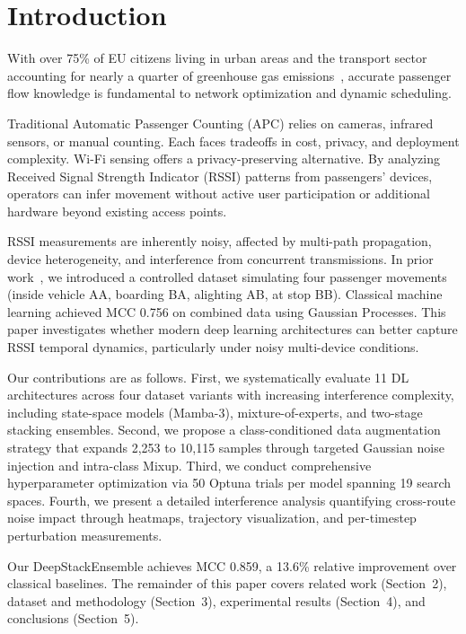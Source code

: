 \section{Introduction}

With over 75\% of EU citizens living in urban areas and the transport sector accounting for nearly a quarter of greenhouse gas emissions~\cite{eea2025transport}, accurate passenger flow knowledge is fundamental to network optimization and dynamic scheduling.

Traditional Automatic Passenger Counting (APC) relies on cameras, infrared sensors, or manual counting. Each faces tradeoffs in cost, privacy, and deployment complexity. Wi-Fi sensing offers a privacy-preserving alternative. By analyzing Received Signal Strength Indicator (RSSI) patterns from passengers' devices, operators can infer movement without active user participation or additional hardware beyond existing access points.

RSSI measurements are inherently noisy, affected by multi-path propagation, device heterogeneity, and interference from concurrent transmissions. In prior work~\cite{ribeiro2026eucnc}, we introduced a controlled dataset simulating four passenger movements (inside vehicle AA, boarding BA, alighting AB, at stop BB). Classical machine learning achieved MCC 0.756 on combined data using Gaussian Processes. This paper investigates whether modern deep learning architectures can better capture RSSI temporal dynamics, particularly under noisy multi-device conditions.

Our contributions are as follows. First, we systematically evaluate 11 DL architectures across four dataset variants with increasing interference complexity, including state-space models (Mamba-3), mixture-of-experts, and two-stage stacking ensembles. Second, we propose a class-conditioned data augmentation strategy that expands 2,253 to 10,115 samples through targeted Gaussian noise injection and intra-class Mixup. Third, we conduct comprehensive hyperparameter optimization via 50 Optuna trials per model spanning 19 search spaces. Fourth, we present a detailed interference analysis quantifying cross-route noise impact through heatmaps, trajectory visualization, and per-timestep perturbation measurements.

Our DeepStackEnsemble achieves MCC 0.859, a 13.6\% relative improvement over classical baselines. The remainder of this paper covers related work (Section~2), dataset and methodology (Section~3), experimental results (Section~4), and conclusions (Section~5).
